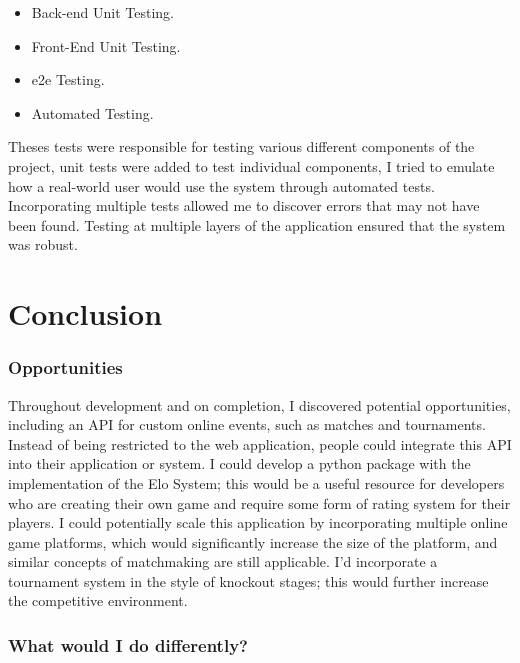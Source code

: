 \begin{itemize}
	\item Back-end Unit Testing.
	\item Front-End Unit Testing.
	\item e2e Testing.
	\item Automated Testing.
\end{itemize}

Theses tests were responsible for testing various different components of the project, unit tests were added to test individual components, I tried to emulate how a real-world user would use the system through automated tests.\newline
Incorporating multiple tests allowed me to discover errors that may not have been found. Testing at multiple layers of the application ensured that the system was robust.
\chapter{Conclusion}

\subsection{Opportunities}
Throughout development and on completion, I discovered potential opportunities, including an API for custom online events, such as matches and tournaments. Instead of being restricted to the web application, people could integrate this API into their application or system. I could develop a python package with the implementation of the Elo System; this would be a useful resource for developers who are creating their own game and require some form of rating system for their players.
I could potentially scale this application by incorporating multiple online game platforms, which would significantly increase the size of the platform, and similar concepts of matchmaking are still applicable. I'd incorporate a tournament system in the style of knockout stages; this would further increase the competitive environment.

\subsection{What would I do differently?}


